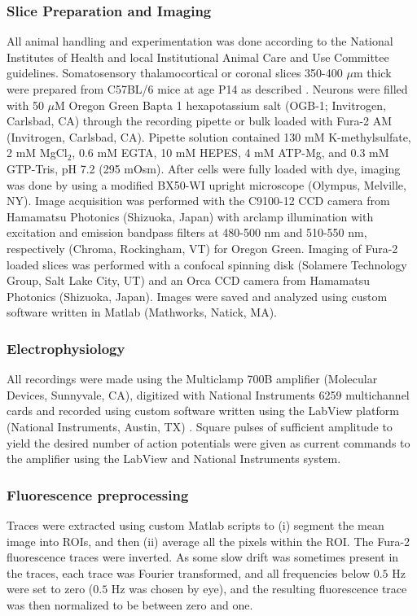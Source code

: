 \subsubsection{Slice Preparation and Imaging} 

All animal handling and experimentation was done according to the National Institutes of Health and local Institutional Animal Care and Use Committee guidelines. Somatosensory thalamocortical or coronal slices 350-400 $\mu$m thick were prepared from C57BL/6 mice at age P14 as described \cite{MacLeanYuste05}. Neurons were filled with 50 $\mu$M Oregon Green Bapta 1 hexapotassium salt (OGB-1; Invitrogen, Carlsbad, CA) through the recording pipette or bulk loaded with Fura-2 AM (Invitrogen, Carlsbad, CA). Pipette solution contained 130 mM K-methylsulfate, 2 mM MgCl$_2$, $0.6$ mM EGTA, 10 mM HEPES, 4 mM ATP-Mg, and $0.3$ mM GTP-Tris, pH 7.2 (295 mOsm).  After cells were fully loaded with dye, imaging was done by using a modified BX50-WI upright microscope (Olympus, Melville, NY).  Image acquisition was performed with the C9100-12 CCD camera from Hamamatsu Photonics (Shizuoka, Japan) with arclamp illumination with excitation and emission bandpass filters at 480-500 nm and 510-550 nm, respectively  (Chroma, Rockingham, VT) for Oregon Green. Imaging of Fura-2 loaded slices was performed with a confocal spinning disk (Solamere Technology Group, Salt Lake City, UT) and an Orca CCD camera from Hamamatsu Photonics (Shizuoka, Japan). Images were saved and analyzed using custom software written in Matlab (Mathworks, Natick, MA).

\subsubsection{Electrophysiology}

All recordings were made using the Multiclamp 700B amplifier (Molecular Devices, Sunnyvale, CA), digitized with National Instruments 6259 multichannel cards and recorded using custom software written using the LabView platform (National Instruments, Austin, TX) .  Square pulses of sufficient amplitude to yield the desired number of action potentials were given as current commands to the amplifier using the LabView and National Instruments system.

\subsubsection{Fluorescence preprocessing}

Traces were extracted using custom Matlab scripts to (i) segment the mean image into ROIs, and then (ii) average all the pixels within the ROI.  The Fura-2 fluorescence traces were inverted.  As some slow drift was sometimes present in the traces, each trace was Fourier transformed, and all frequencies below $0.5$ Hz were set to zero ($0.5$ Hz was chosen by eye), and the resulting fluorescence trace was then normalized to be between zero and one.  








